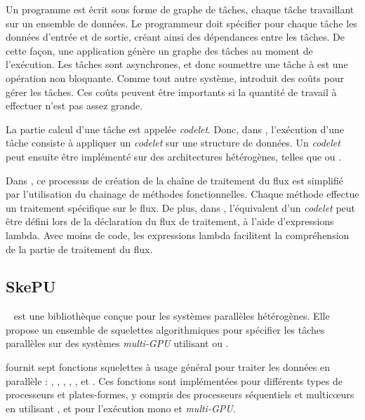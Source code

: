 Un programme  est \'ecrit sous forme de graphe de t\^aches, chaque t\^ache travaillant sur un ensemble de donn\'ees. Le programmeur doit sp\'ecifier pour chaque t\^ache les donn\'ees d'entr\'ee et de sortie, cr\'eant ainsi des d\'ependances entre les t\^aches. De cette fa\c{c}on, une application  g\'en\`ere un graphe des t\^aches au moment de l'ex\'ecution. Les t\^aches sont asynchrones, et donc soumettre une t\^ache \`a  est une op\'eration non bloquante. Comme tout autre syst\`eme,  introduit des co\^uts pour g\'erer les t\^aches. Ces co\^uts peuvent \^etre importants si la quantit\'e de travail \`a effectuer n'est pas assez grande.

La partie calcul d'une t\^ache est appel\'ee \emph{codelet}. Donc, dans , l'ex\'ecution d'une t\^ache consiste \`a appliquer un \emph{codelet} sur une structure de donn\'ees. Un \emph{codelet} peut ensuite \^etre impl\'ement\'e sur des architectures h\'et\'erog\`enes, telles que  ou .

Dans , ce processus de cr\'eation de la cha\^ine de traitement du flux est  simplifi\'e par l'utilisation du chainage de m\'ethodes fonctionnelles. Chaque m\'ethode effectue un traitement sp\'ecifique sur le flux. De plus, dans , l'équivalent d'un \emph{codelet}  peut \^etre d\'efini lors de la d\'eclaration du flux de traitement, \`a l'aide d'expressions {lambda}. Avec moins de code, les expressions {lambda} facilitent la compr\'ehension de la partie de traitement du flux.




 


\subsection{SkePU} 
\label{skepu.sect}

~\citep{skePuReferenceEnLigne} est une biblioth\`eque  con\c{c}ue pour les syst\`emes parall\`eles h\'et\'erog\`enes. Elle propose un ensemble de squelettes algorithmiques pour sp\'ecifier les t\^aches parall\`eles sur des syst\`emes \emph{multi-GPU} utilisant  ou .

 fournit sept fonctions squelettes \`a usage g\'en\'eral pour traiter les donn\'ees en parall\`ele : , , , , ,  et . Ces fonctions sont impl\'ementées pour diff\'erents types de processeurs et plates-formes, y compris des processeurs s\'equentiels et multicœurs en utilisant ,  et  pour l'ex\'ecution mono et \emph{multi-GPU}.


